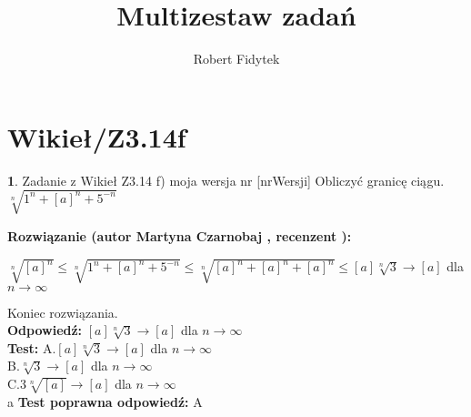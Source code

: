 \documentclass[12pt, a4paper]{article}
\title{Multizestaw zadań}
\author{Robert Fidytek}
\date{}
\theoremstyle{definition} %
\newtheorem{zad}{}
\newcommand{\kategoria}[1]{\section{#1}} %
\newcommand{\zadStart}[1]{\begin{zad}#1\newline} %
\newcommand{\zadStop}{\end{zad}}   %
\newcommand{\rozwStart}[2]{\noindent \textbf{Rozwiązanie (autor #1 , recenzent #2): }\newline} %
\newcommand{\rozwStop}{\newline}                                            %
\newcommand{\odpStart}{\noindent \textbf{Odpowiedź:}\newline}    %
\newcommand{\odpStop}{\newline}                                             %
\newcommand{\testStart}{\noindent \textbf{Test:}\newline} %
\newcommand{\testStop}{\newline} %
\newcommand{\kluczStart}{\noindent \textbf{Test poprawna odpowiedź:}\newline} %
\newcommand{\kluczStop}{\newline} %
\begin{document}
\maketitle


\kategoria{Wikieł/Z3.14f}
\zadStart{Zadanie z Wikieł Z3.14 f) moja wersja nr [nrWersji]}
Obliczyć granicę ciągu.\\
$ \sqrt[n]{1^{n} + [a]^{n} + 5^{-n}} $\\
\zadStop
\rozwStart{Martyna Czarnobaj}{}
\begin{center}
	$ \sqrt[n]{[a]^{n}} \leq \sqrt[n]{1^{n} + [a]^{n} + 5^{-n}} \leq \sqrt[n]{[a]^{n} + [a]^{n} + [a]^{n}} \leq [a] \sqrt[n]{3} \rightarrow [a]  $ dla $ n \rightarrow \infty $\\
\end{center}

Koniec rozwiązania.\\
\rozwStop
\odpStart
$ [a] \sqrt[n]{3} \rightarrow [a]  $ dla $ n \rightarrow \infty $\\
\odpStop
\testStart
A.$[a] \sqrt[n]{3} \rightarrow [a]  $ dla $ n \rightarrow \infty $\\
B.$\sqrt[n]{3} \rightarrow [a]  $ dla $ n \rightarrow \infty $\\
C.$3 \sqrt[n]{[a]} \rightarrow [a]  $ dla $ n \rightarrow \infty $\\
a
\testStop
\kluczStart
A
\kluczStop
\end{document}
